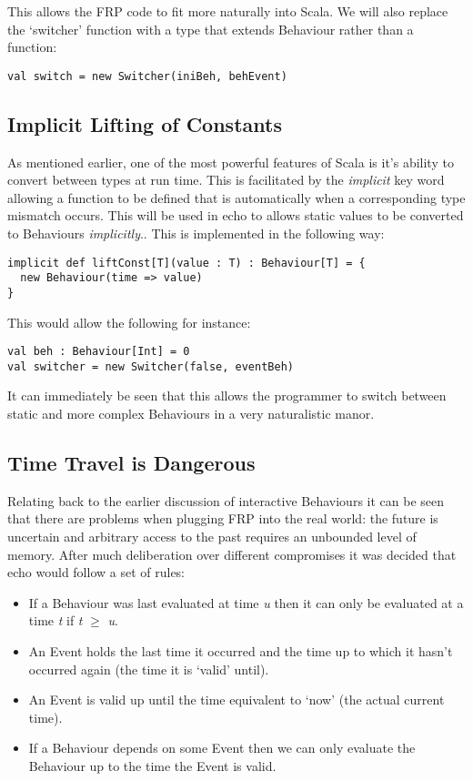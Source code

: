     This allows the FRP code to fit more naturally into Scala. We will also replace the `switcher' function
    with a type that extends Behaviour rather than a function:
    
\begin{verbatim}
val switch = new Switcher(iniBeh, behEvent)
\end{verbatim}

    \subsection{Implicit Lifting of Constants}
      As mentioned earlier, one of the most powerful features of Scala is it's ability to convert between
      types at run time. This is facilitated by the \emph{implicit} key word allowing a function to be defined
      that is automatically when a corresponding type mismatch occurs. This will be used in echo to allows 
      static values to be converted to Behaviours \emph{implicitly}.. This is implemented in the following way:  

\begin{verbatim}
implicit def liftConst[T](value : T) : Behaviour[T] = {
  new Behaviour(time => value)
}
\end{verbatim}              
      
      This would allow the following for instance:

\begin{verbatim}
val beh : Behaviour[Int] = 0
val switcher = new Switcher(false, eventBeh)
\end{verbatim}       

      It can immediately be seen that this allows the programmer to switch between static and more complex
      Behaviours in a very naturalistic manor.
    
    \subsection{Time Travel is Dangerous}
      Relating back to the earlier discussion of interactive Behaviours it can be seen
      that there are problems when plugging FRP into the real world: the future is uncertain and
      arbitrary access to the past requires an unbounded level of memory. After much deliberation
      over different compromises it was decided that echo would follow a set of rules:
      
      \begin{itemize}
        \item If a Behaviour was last evaluated at time \emph{u} then it can only be evaluated at
        a time \emph{t} if \emph{t} $\geq$ \emph{u}.
        \item An Event holds the last time it occurred and the time up to which it hasn't occurred
        again (the time it is `valid' until).
        \item An Event is valid up until the time equivalent to `now' (the actual current time).
        \item If a Behaviour depends on some Event then we can only evaluate the Behaviour up to
        the time the Event is valid.
      \end{itemize}
      
